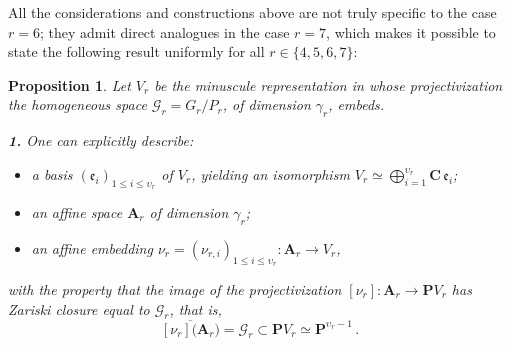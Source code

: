 \documentclass[11pt]{amsart}
\newcommand{\sk}{\smallskip}
\newtheorem{prop}[thm]{Proposition}
\begin{document}
 
 All the considerations and constructions above are not truly specific to the case \( r = 6 \); they admit direct analogues in the case \( r = 7 \), which makes it possible to state the following result uniformly for all \( r \in \{4, 5, 6, 7\} \):
\begin{prop} %
Let \( V_r \) be the minuscule representation in whose projectivization the homogeneous space \( \boldsymbol{\mathcal{G}}_r = G_r / P_r \), of dimension \( \gamma_r \), embeds.

\noindent 
{\bf 1.} One can explicitly describe:
\begin{itemize}%
    \item[$-$] \vspace{-0.15cm} a  basis \( (\mathfrak e_i)_{1 \leq i \leq \upsilon_r} \) of \( V_r \), yielding an isomorphism \( V_r \simeq \bigoplus_{i=1}^{\upsilon_r} \mathbf{C} \,\mathfrak e_i \);\sk 
    
    \item[$-$] an affine space \( \mathbf{A}_r \) of dimension \( \gamma_r \);
    \sk 
    
    \item[$-$] an affine  embedding  \( \nu_r = (\nu_{r,i})_{1 \leq i \leq \upsilon_r} : 
    \mathbf{A}_r \to V_r \), 
\end{itemize}%
  with the property that the image of the projectivization
  \(
  [\nu_r] : \mathbf{A}_r \to \mathbf{P}V_r
  \)
  has Zariski closure equal to \( \boldsymbol{\mathcal G}_r  \), that is, 
$$ \overline{[\nu_r]\big(\mathbf A_r\big)}=\boldsymbol{\mathcal G}_r
\subset 
\mathbf PV_r\simeq \mathbf P^{\upsilon_r-1}\, . $$







\end{prop}
\end{document}
